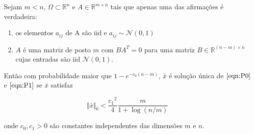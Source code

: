 \begin{teorema} \cite{zhang2008theory} Sejam $m < n$, $\Omega \subset \mathbb{R}^n$ e $A \in \mathbb{R}^{m \times n}$ tais que apenas uma das afirmações é verdadeira:
\begin{enumerate}
\item os elementos $a_{ij}$ de A são iid e $a_{ij} \sim \mathcal{N}(0,1)$
\item $A$ é uma matriz de posto $m$ com $BA^{T} = 0$ para uma matriz $B \in \mathbb{R}^{(n - m) \times n}$ cujas entradas são iid $\mathcal{N}(0,1)$.
\end{enumerate}
Então com probabilidade maior que $1 - e^{-c_0(n-m)}$, $\bar{x}$ é solução única de $\eqref{eqn:P0}$ e $\eqref{eqn:P1}$ se $\bar{x}$ satisfaz

$$ \Vert \bar{x} \Vert_0 < \frac{{c_1}^2}{4} \frac{m}{1 + \log(n/m)}$$

onde $c_0, c_1 > 0$ são constantes independentes das dimensões $m$ e $n$.
\label{thm:normalCS}
\end{teorema}